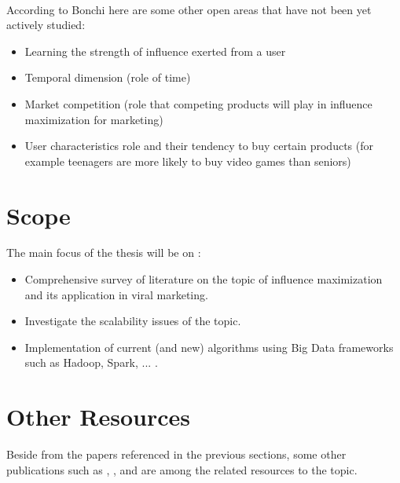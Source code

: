 \documentclass[english]{tktltiki}
\begin{document}
\\
According to Bonchi \cite{Bon11} here are some other open areas that have not been yet actively studied:
\begin{itemize}
\item Learning the strength of influence exerted from a user
\item Temporal dimension (role of time)
\item Market competition (role that competing products will play in influence maximization for marketing)
\item User characteristics role and their tendency to buy certain products (for example teenagers are more likely to buy video games than seniors)
\end{itemize}
\section{Scope}
The main focus of the thesis will be on :
\begin{itemize}
\item Comprehensive survey of literature on the topic of influence maximization and its application in viral marketing.
\item Investigate the scalability issues of the topic.
\item Implementation of current (and new) algorithms using Big Data frameworks  such as Hadoop, Spark, ... .
\end{itemize}

\section{Other Resources}
Beside from the papers referenced in the previous sections, some other publications such as \cite{domingo02}, \cite{goyal10}, and \cite{cheng13} are among the related resources to the topic. 
\pagebreak



\lastpage

\pagestyle{empty}
\end{document}
